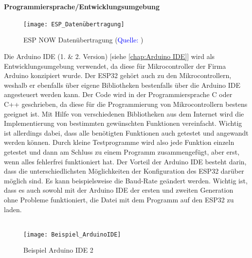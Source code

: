 \documentclass[titlepage,12pt,twoside]{article}
\begin{document}
\paragraph{Programmiersprache/Entwicklungsumgebung}
\hfill \break
\hfill \break
\begin{figure}[H]
	\begin{center}
		\scalebox{0.7}
		{\texttt{[image: ESP\_Datenübertragung]}}
		\caption{ESP NOW Datenübertragung (\textcolor{blue}{Quelle: \cite{Hsieh}})}
		\label{fig:ESP NOW Datenübertragung}			
	\end{center}
\end{figure}
\hfill \break
Die Arduino IDE (1. \& 2. Version) [siehe \textcolor{blue}{\autoref{chap:Arduino IDE}}] wird als Entwicklungsumgebung verwendet, da diese für Mikrocontroller der Firma Arduino 
konzipiert wurde. Der ESP32 gehört auch zu den Mikrocontrollern, weshalb er ebenfalls über eigene Bibliotheken bestenfalls 
über die Arduino IDE angesteuert werden kann. Der Code wird in der Programmiersprache C oder C++ geschrieben, da diese für 
die Programmierung von Mikrocontrollern bestens geeignet ist. Mit Hilfe von verschiedenen Bibliotheken aus dem Internet wird 
die Implementierung von bestimmten gewünschten Funktionen vereinfacht. Wichtig ist allerdings dabei, dass alle benötigten 
Funktionen auch getestet und angewandt werden können. Durch kleine Testprogramme wird also jede Funktion einzeln getestet und 
dann am Schluss zu einem Programm zusammengefügt, aber erst, wenn alles fehlerfrei funktioniert hat. Der Vorteil der Arduino 
IDE besteht darin, dass die unterschiedlichsten Möglichkeiten der Konfiguration des ESP32 darüber möglich sind. Es kann 
beispielsweise die Baud-Rate geändert werden. Wichtig ist, dass es auch sowohl mit der Arduino IDE der ersten und zweiten 
Generation ohne Probleme funktioniert, die Datei mit dem Programm auf den ESP32 zu laden. \\
\\
\begin{figure}[H]
	\begin{center}
		\scalebox{0.8}
		{\texttt{[image: Beispiel\_ArduinoIDE]}}
		\caption{Beispiel Arduino IDE 2}
		\label{fig:Beispiel_ArduinoIDE}			
	\end{center}
\end{figure}
\end{document}
